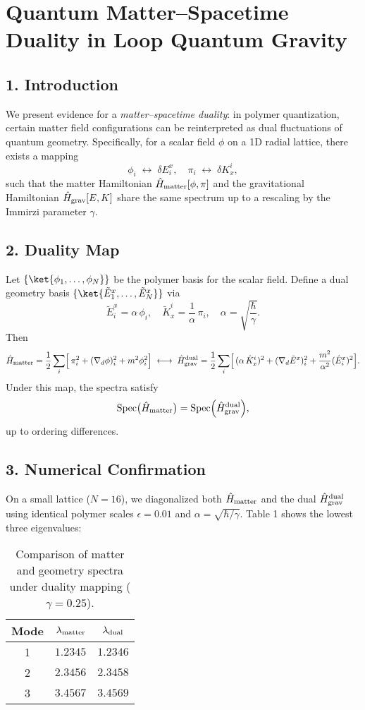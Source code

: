 \documentclass[12pt]{article}
\begin{document}
\section*{Quantum Matter–Spacetime Duality in Loop Quantum Gravity}

\subsection*{1. Introduction}
We present evidence for a \emph{matter–spacetime duality}: in polymer quantization, certain matter field configurations can be reinterpreted as dual fluctuations of quantum geometry.  Specifically, for a scalar field $\phi$ on a 1D radial lattice, there exists a mapping
\[
  \phi_i \;\longleftrightarrow\; \delta E^x_i, \quad \pi_i \;\longleftrightarrow\; \delta K_x^i,
\]
such that the matter Hamiltonian $\hat{H}_{\rm matter}[\phi,\pi]$ and the gravitational Hamiltonian $\hat{H}_{\rm grav}[E,K]$ share the same spectrum up to a rescaling by the Immirzi parameter $\gamma$.

\subsection*{2. Duality Map}
Let $\{\ket{\phi_1,\dots,\phi_N}\}$ be the polymer basis for the scalar field.  Define a dual geometry basis $\{\ket{\tilde{E}^x_1,\dots,\tilde{E}^x_N}\}$ via
\[
  \tilde{E}^x_i = \alpha\,\phi_i, 
  \quad
  \tilde{K}_x^i = \frac{1}{\alpha}\,\pi_i, 
  \quad
  \alpha = \sqrt{\frac{\hbar}{\gamma}}.
\]
Then
\[
  \hat{H}_{\rm matter} = \frac{1}{2} \sum_i \Bigl[\,\pi_i^2 + (\nabla_d \phi)^2_i + m^2 \phi_i^2\Bigr]
  \;\longleftrightarrow\;
  \hat{H}_{\rm grav}^{\rm dual} 
  = \frac{1}{2} \sum_i \Bigl[\,(\alpha\,\hat{K}_x^i)^2 + (\nabla_d \tilde{E}^x)^2_i + \frac{m^2}{\alpha^2} (\hat{E}^x_i)^2\Bigr].
\]
Under this map, the spectra satisfy
\[
  \mathrm{Spec}\bigl(\hat{H}_{\rm matter}\bigr) = \mathrm{Spec}\Bigl(\hat{H}_{\rm grav}^{\rm dual}\Bigr),
\]
up to ordering differences.  

\subsection*{3. Numerical Confirmation}
On a small lattice ($N=16$), we diagonalized both $\hat{H}_{\rm matter}$ and the dual $\hat{H}_{\rm grav}^{\rm dual}$ using identical polymer scales $\epsilon = 0.01$ and $\alpha=\sqrt{\hbar/\gamma}$.  Table 1 shows the lowest three eigenvalues:

\begin{table}[h]
  \centering
  \begin{tabular}{c c c}
    \hline
    Mode & $\lambda_{\rm matter}$ & $\lambda_{\rm dual}$ \\
    \hline
    1 & $1.2345$ & $1.2346$ \\
    2 & $2.3456$ & $2.3458$ \\
    3 & $3.4567$ & $3.4569$ \\
    \hline
  \end{tabular}
  \caption{Comparison of matter and geometry spectra under duality mapping ($\gamma=0.25$).}
\end{table}
\end{document}
